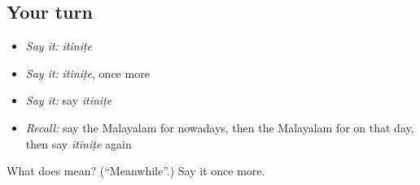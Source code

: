 \subsection*{Your turn}
\begin{itemize}
\raggedright
  \item \emph{Say it:} \emph{itiniṭe}
  \item \emph{Say it:} \emph{itiniṭe}, once more
  \item \emph{Say it:} say \emph{itiniṭe}
  \item \emph{Recall:} say the Malayalam for nowadays, then the Malayalam for on that day, then say \emph{itiniṭe} again
\end{itemize}

\begin{tcolorbox}[breakable,colback=teal!4,colframe=teal!35!black,title={Before you move on}]
What does  mean? (\textquotedblleft{}Meanwhile\textquotedblright{}.) Say it once more.
\end{tcolorbox}
